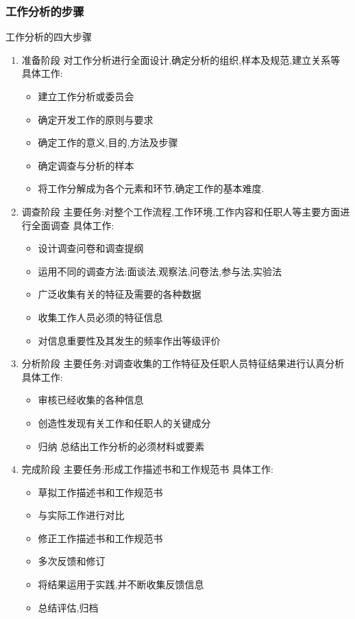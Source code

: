 \documentclass{ctexart}
\begin{document}
\subsubsection{工作分析的步骤}
\label{sec-1-2-2}
工作分析的四大步骤
\begin{enumerate}
\item 准备阶段
\label{sec-1-2-2-1}
对工作分析进行全面设计,确定分析的组织,样本及规范,建立关系等
具体工作:
\begin{itemize}
\item 建立工作分析或委员会
\item 确定开发工作的原则与要求
\item 确定工作的意义,目的,方法及步骤
\item 确定调查与分析的样本
\item 将工作分解成为各个元素和环节,确定工作的基本难度.
\end{itemize}
\item 调查阶段
\label{sec-1-2-2-2}
主要任务:对整个工作流程,工作环境,工作内容和任职人等主要方面进行全面调查
具体工作:
\begin{itemize}
\item 设计调查问卷和调查提纲
\item 运用不同的调查方法:面谈法,观察法,问卷法,参与法,实验法
\item 广泛收集有关的特征及需要的各种数据
\item 收集工作人员必须的特征信息
\item 对信息重要性及其发生的频率作出等级评价
\end{itemize}
\item 分析阶段
\label{sec-1-2-2-3}
主要任务:对调查收集的工作特征及任职人员特征结果进行认真分析
具体工作:
\begin{itemize}
\item 审核已经收集的各种信息
\item 创造性发现有关工作和任职人的关键成分
\item 归纳 总结出工作分析的必须材料或要素
\end{itemize}
\item 完成阶段
\label{sec-1-2-2-4}
主要任务:形成工作描述书和工作规范书
具体工作:
\begin{itemize}
\item 草拟工作描述书和工作规范书
\item 与实际工作进行对比
\item 修正工作描述书和工作规范书
\item 多次反馈和修订
\item 将结果运用于实践,并不断收集反馈信息
\item 总结评估,归档
\end{itemize}
\end{enumerate}
\end{document}
